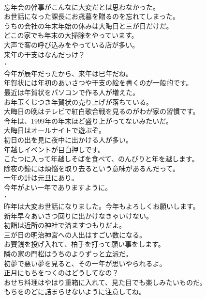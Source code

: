 \documentclass[8pt]{extreport}
\begin{document}
\begin{CJK}{UTF8}{min}
\\	忘年会の幹事がこんなに大変だとは思わなかった。	
\\	お世話になった課長にお歳暮を贈るのを忘れてしまった。	
\\	うちの会社の年末年始の休みは大晦日と三が日だけだ。	
\\	どこの家でも年末の大掃除をやっています。	
\\	大声で客の呼び込みをやっている店が多い。	
\\	来年の干支はなんだっけ？	
\\	･ 
\\	今年が辰年だったから、来年は巳年だね。	
\\	年賀状には年初のあいさつや干支の絵を書くのが一般的です。	
\\	最近は年賀状をパソコンで作る人が増えた。	
\\	お年玉くじつき年賀状の売り上げが落ちている。	
\\	大晦日の晩はテレビで紅白歌合戦を見るのがわが家の習慣です。	
\\	今年は、1999年の年末ほど盛り上がってないみたいだ。	
\\	大晦日はオールナイトで遊ぶぞ。	
\\	初日の出を見に夜中に出かける人が多い。	
\\	年越しイベントが目白押しです。	
\\	こたつに入って年越しそばを食べて、のんびりと年を越します。	
\\	除夜の鐘には煩悩を取り去るという意味があるんだって。	
\\	一年の計は元旦にあり。	
\\	今年がよい一年でありますように。	
\\	･ 
\\	昨年は大変お世話になりました。今年もよろしくお願いします。	
\\	新年早々あいさつ回りに出かけなきゃいけない。	
\\	初詣は近所の神社で済ますつもりだよ。	
\\	三が日の明治神宮への人出はすごい数になる。	
\\	お賽銭を投げ入れて、柏手を打って願い事をします。	
\\	隣の家の門松はうちのよりずっと立派だ。	
\\	初夢で悪い夢を見ると、その一年が思いやられるよ。	
\\	正月にもちをつくのはどうしてなの？	
\\	おせち料理はやはり重箱に入れて、見た目でも楽しみたいものだ。	
\\	もちをのどに詰まらせないように注意してね。	

\end{CJK}
\end{document}
